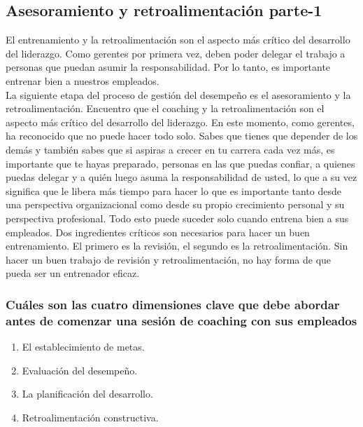 \documentclass[10pt]{book}
\begin{document}
\subsection{Asesoramiento  y retroalimentación parte-1}
El entrenamiento y la retroalimentación son el aspecto más crítico del desarrollo del liderazgo. Como gerentes por primera vez, deben poder delegar el trabajo a personas que puedan asumir la responsabilidad. Por lo tanto, es importante entrenar bien a nuestros empleados.\\
La siguiente etapa del proceso de gestión del desempeño es el asesoramiento y la retroalimentación.  Encuentro que el coaching y la retroalimentación son el aspecto más crítico del desarrollo del liderazgo. En este momento, como gerentes, ha reconocido que no puede hacer todo solo. Sabes que tienes que depender de los demás y también sabes que si aspiras a crecer en tu carrera cada vez más, es importante que te hayas preparado, personas en las que puedas confiar, a quienes puedas delegar y a quién luego asuma la responsabilidad de usted, lo que a su vez significa que le libera más tiempo para hacer lo que es importante tanto desde una perspectiva organizacional como desde su propio crecimiento personal y su perspectiva profesional. Todo esto puede suceder solo cuando entrena bien a sus empleados. Dos ingredientes críticos son necesarios para hacer un buen entrenamiento. El primero es la revisión, el segundo es la retroalimentación. Sin hacer un buen trabajo de revisión y retroalimentación, no hay forma de que pueda ser un entrenador eficaz. 
\subsubsection{Cuáles son las cuatro dimensiones clave que debe abordar antes de comenzar una sesión de coaching con sus empleados}
\begin{enumerate}[\bfseries 1.]
\item El establecimiento de metas. 
\item Evaluación del desempeño. 
\item La planificación del desarrollo. 
\item Retroalimentación constructiva.
\end{enumerate}
\end{document}
